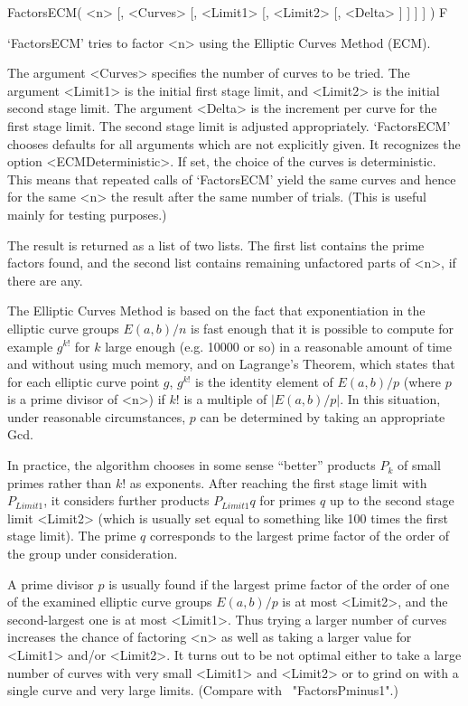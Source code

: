 
\>FactorsECM( <n> [, <Curves> [, <Limit1> [, <Limit2> [, <Delta> ] ] ] ] ) F

`FactorsECM' tries to factor <n> using the Elliptic Curves Method (ECM).

The argument <Curves> specifies the number of curves to be tried.
The argument <Limit1> is the initial
first stage limit, and
<Limit2> is the initial
second stage limit.
The argument <Delta> is the increment per curve for the first stage
limit. The second stage limit is adjusted appropriately.
`FactorsECM' chooses defaults for all arguments which are not
explicitly given.
It recognizes the option <ECMDeterministic>.
If set, the choice of the curves is deterministic.
This means that repeated calls of `FactorsECM' yield the same curves
and hence for the same <n> the result after the same number of trials.
(This is useful mainly for testing purposes.)

The result is returned as a list of two lists. The first list
contains the prime factors found, and the second list contains
remaining unfactored parts of <n>, if there are any.

The Elliptic Curves Method is based on the fact that exponentiation
in the
elliptic curve groups 
$E(a,b)/n$ is fast enough
that it is possible to compute for example $g^{k!}$ for $k$ large enough 
(e.g. 10000 or so) in a reasonable amount of time and without
using much memory, and on Lagrange's Theorem, 
which states that for each
elliptic curve point $g$,
$g^{k!}$ is the identity element of $E(a,b)/p$ (where $p$ is a prime
divisor of <n>) if $k!$ is a multiple of $|E(a,b)/p|$.
In this situation, under reasonable circumstances, $p$ can be
determined by taking an appropriate Gcd.

In practice, the algorithm chooses in some sense ``better''
products $P_k$ of small primes rather than $k!$ as exponents.
After reaching the first stage limit with $P_{Limit1}$, it
considers further products $P_{Limit1}q$ for primes $q$ up to
the second stage limit <Limit2> (which is usually set equal to
something like 100 times the first stage limit).
The prime $q$ corresponds to the largest prime factor of the
order of the group under consideration.

A prime divisor $p$ is usually found if the largest prime factor
of the order of one of the examined elliptic curve groups $E(a,b)/p$
is at most <Limit2>, and the second-largest one is at most <Limit1>.
Thus trying a larger number of curves increases the chance of
factoring <n> as well as taking a larger value
for <Limit1> and/or <Limit2>. It turns out to be not optimal either
to take a large number of curves with very small <Limit1> and <Limit2>
or to grind on with a single curve and very large limits.
(Compare with ~"FactorsPminus1".)

